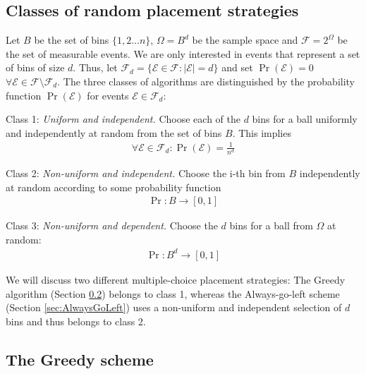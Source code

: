 \documentclass[a4paper,12pt]{article}
\begin{document}
\subsection{Classes of random placement strategies}
\label{sec:classesOfPlacement}
Let $B$ be the set of bins $\{1,2...n\}$, $\Omega = B^{d}$ be the sample space and $\mathcal{F} = 2^{\Omega}$ be the set of measurable events. We are only interested in events that represent a set of bins of size $d$. Thus, let $\mathcal{F}_d = \{\mathcal{E} \in \mathcal{F}: \left\vert \mathcal{E} \right\vert = d\}$ and set $\Pr\left(\mathcal{E}  \right) = 0$  $\forall \mathcal{E} \in \mathcal{F} \setminus \mathcal{F}_d $. The three classes of algorithms are distinguished by the probability function $\Pr\left(\mathcal{E}\right)$ for events $\mathcal{E} \in \mathcal{F}_d$:
\begin{compactitem}
\item  Class 1: \emph{Uniform and independent.} Choose each of the $d$ bins for a ball uniformly and independently at random from the set of bins $B$. This implies 
\begin{align*}
\forall \mathcal{E} \in \mathcal{F}_d: \Pr\left(\mathcal{E}\right) = \frac{1}{n ^{d}}
\end{align*}
\item Class 2: \emph{Non-uniform and independent.} Choose the i-th bin from $B$ independently at random according to some probability function
\begin{align*}
\Pr: B \rightarrow \left[0,1\right]
\end{align*}

\item Class 3: \emph{Non-uniform and dependent.} Choose the $d$ bins for a ball from $\Omega$ at random:
\begin{align*}
\Pr: B^{d} \rightarrow \left[0,1\right]
\end{align*}
\end{compactitem} 
 
We will discuss two different multiple-choice placement strategies: The Greedy algorithm (Section \ref{sec:greedy}) belongs to class 1, whereas the Always-go-left scheme (Section \ref{sec:AlwaysGoLeft}) uses a non-uniform and independent selection of $d$ bins and thus belongs to class 2.

\subsection{The Greedy scheme}
\label{sec:greedy}
\end{document}
